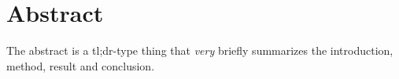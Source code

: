 \chapter{Abstract}
The abstract is a tl;dr-type thing that \textit{very} briefly summarizes the introduction, method, result and conclusion.
